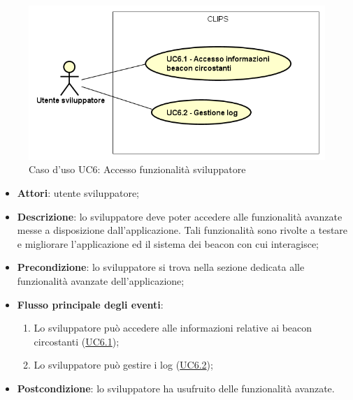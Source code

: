\documentclass[../AnalisiDeiRequisiti.tex]{subfiles}
\begin{document}
        \begin{figure}[!h]
            \centering
            \includegraphics[scale=0.95, width=\textwidth]{img/UC6.png}
            \caption{Caso d'uso UC6: Accesso funzionalità sviluppatore}\label{fig:UC6} 
        \end{figure}
\begin{itemize}
\item \textbf{Attori}: utente sviluppatore;
\item \textbf{Descrizione}: lo sviluppatore deve poter accedere alle funzionalità avanzate messe a disposizione dall'applicazione. Tali funzionalità sono rivolte a testare e migliorare l'applicazione ed il sistema dei beacon con cui interagisce; 
      \item \textbf{Precondizione}: lo sviluppatore si trova nella sezione dedicata alle funzionalità avanzate dell'applicazione;

        \item \textbf{Flusso principale degli eventi}:
          \begin{enumerate}
          \item Lo sviluppatore può accedere alle informazioni relative ai beacon circostanti (\hyperlink{UC6.1}{UC6.1});
          \item Lo sviluppatore può gestire i log (\hyperlink{UC6.2}{UC6.2});

      \end{enumerate}
    \item \textbf{Postcondizione}: lo sviluppatore ha usufruito delle funzionalità avanzate.
  \end{itemize}
\hypertarget{UC6.1}{}
\end{document}
